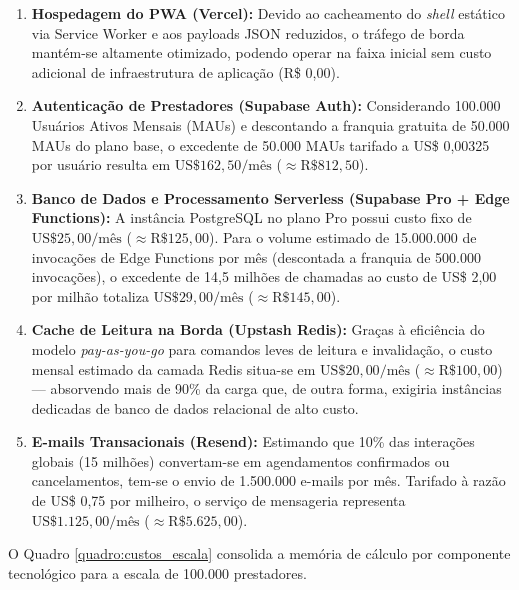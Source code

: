 \documentclass[12pt,a4paper]{article}
\begin{document}
\begin{enumerate}
    \item \textbf{Hospedagem do PWA (Vercel):} Devido ao cacheamento do \textit{shell} estático via Service Worker e aos payloads JSON reduzidos, o tráfego de borda mantém-se altamente otimizado, podendo operar na faixa inicial sem custo adicional de infraestrutura de aplicação (R\$ 0,00).
    \item \textbf{Autenticação de Prestadores (Supabase Auth):} Considerando 100.000 Usuários Ativos Mensais (MAUs) e descontando a franquia gratuita de 50.000 MAUs do plano base, o excedente de 50.000 MAUs tarifado a US\$ 0,00325 por usuário resulta em $\text{US\$ } 162{,}50/\text{mês}$ ($\approx \text{R\$ } 812{,}50$).
    \item \textbf{Banco de Dados e Processamento Serverless (Supabase Pro + Edge Functions):} A instância PostgreSQL no plano Pro possui custo fixo de $\text{US\$ } 25{,}00/\text{mês}$ ($\approx \text{R\$ } 125{,}00$). Para o volume estimado de 15.000.000 de invocações de Edge Functions por mês (descontada a franquia de 500.000 invocações), o excedente de 14,5 milhões de chamadas ao custo de US\$ 2,00 por milhão totaliza $\text{US\$ } 29{,}00/\text{mês}$ ($\approx \text{R\$ } 145{,}00$).
    \item \textbf{Cache de Leitura na Borda (Upstash Redis):} Graças à eficiência do modelo \textit{pay-as-you-go} para comandos leves de leitura e invalidação, o custo mensal estimado da camada Redis situa-se em $\text{US\$ } 20{,}00/\text{mês}$ ($\approx \text{R\$ } 100{,}00$) --- absorvendo mais de 90\% da carga que, de outra forma, exigiria instâncias dedicadas de banco de dados relacional de alto custo.
    \item \textbf{E-mails Transacionais (Resend):} Estimando que 10\% das interações globais (15 milhões) convertam-se em agendamentos confirmados ou cancelamentos, tem-se o envio de 1.500.000 e-mails por mês. Tarifado à razão de US\$ 0,75 por milheiro, o serviço de mensageria representa $\text{US\$ } 1.125{,}00/\text{mês}$ ($\approx \text{R\$ } 5.625{,}00$).
\end{enumerate}

O Quadro \ref{quadro:custos_escala} consolida a memória de cálculo por componente tecnológico para a escala de 100.000 prestadores.
\end{document}
